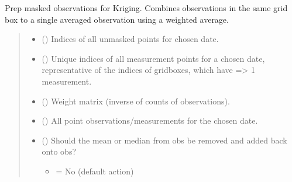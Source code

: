 \documentclass[letterpaper,10pt,english]{sphinxmanual}
\begin{document}
\begin{fulllineitems}
\label{\detokenize{kriging:glomar_gridding.kriging.prep_obs_for_kriging}}
\pysigstartsignatures
\pysiglinewithargsret
{}
{\sphinxparamcomma {}\sphinxparamcomma {}\sphinxparamcomma {}\sphinxparamcomma {}\sphinxparamcomma {}\sphinxparamcomma {}}
{}
\pysigstopsignatures
\sphinxAtStartPar
Prep masked observations for Kriging. Combines observations in the same
grid box to a single averaged observation using a weighted average.
\begin{quote}\begin{description}
\begin{itemize}
\item {}
\sphinxAtStartPar
{} () \textendash{} Indices of all un\sphinxhyphen{}masked points for chosen date.

\item {}
\sphinxAtStartPar
{} () \textendash{} Unique indices of all measurement points for a chosen date,
representative of the indices of gridboxes, which have =\textgreater{} 1 measurement.

\item {}
\sphinxAtStartPar
{} () \textendash{} Weight matrix (inverse of counts of observations).

\item {}
\sphinxAtStartPar
{} () \textendash{} All point observations/measurements for the chosen date.

\item {}
\sphinxAtStartPar
{} () \textendash{}
\sphinxAtStartPar
Should the mean or median from obs be removed and added back onto obs?
\begin{itemize}
\item {}
 = No (default action)


\end{itemize}
\end{itemize}
\end{description}
\end{quote}
\end{fulllineitems}
\end{document}
